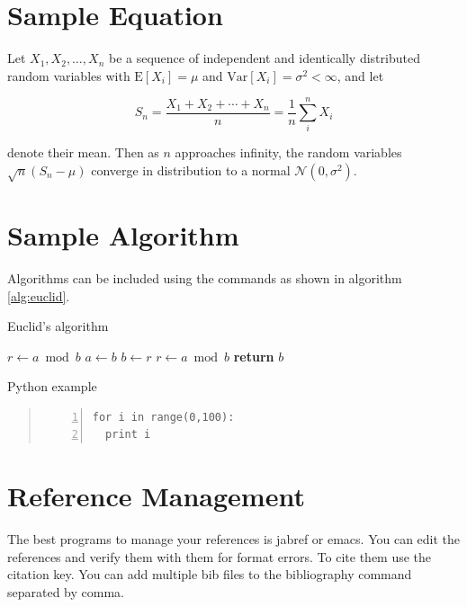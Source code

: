 \documentclass[9pt,twocolumn,twoside]{styles/osajnl}
\begin{document}
\section{Sample Equation}

Let $X_1, X_2, \ldots, X_n$ be a sequence of independent and
identically distributed random variables with $\text{E}[X_i] = \mu$
and $\text{Var}[X_i] = \sigma^2 < \infty$, and let

\begin{equation}
S_n = \frac{X_1 + X_2 + \cdots + X_n}{n}
      = \frac{1}{n}\sum_{i}^{n} X_i
\label{eq:refname1}
\end{equation}

denote their mean. Then as $n$ approaches infinity, the random
variables $\sqrt{n}(S_n - \mu)$ converge in distribution to a normal
$\mathcal{N}(0, \sigma^2)$. 

\section{Sample Algorithm}

Algorithms can be included using the commands as shown in algorithm
\ref{alg:euclid}.

\begin{algorithm}
\caption{Euclid’s algorithm}\label{alg:euclid}
\begin{algorithmic}[1]
\State $r\gets a\bmod b$
\State $a\gets b$
\State $b\gets r$
\State $r\gets a\bmod b$
\EndWhile\label{euclidendwhile}
\State \textbf{return} $b$
\EndProcedure
\end{algorithmic}
\end{algorithm}

\begin{algorithm}
\caption{Python example}\label{alg:python}
\begin{quote}
\begin{Verbatim}[numbers=left]
for i in range(0,100):
  print i
\end{Verbatim}
\end{quote}
\end{algorithm}

\section{Reference Management}

The best programs to manage your references is jabref or emacs. You
can edit the references and verify them with them for format
errors. To cite them use the citation key. You can add multiple bib
files to the bibliography command separated by comma.
\end{document}
